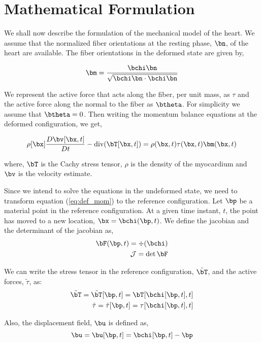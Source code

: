 \section{Mathematical Formulation}

We shall now describe the formulation of the mechanical model of the heart. We assume that the normalized fiber orientations at the resting phase, $\bn$, of the heart are available. The fiber orientations in the deformed state are given by,

\begin{equation}
\bm = \frac{\bchi\bn}{\sqrt{\bchi\bn\cdot\bchi\bn}}
\end{equation}

We represent the active force that acts along the fiber, per unit mass, as $\tau$ and the active force along the normal to the fiber as $\btheta$. For simplicity we assume that $\btheta = 0$. Then writing the momentum balance equations at the deformed configuration, we get,

\begin{equation}
\label{eq:def_mom}
\rho[\bx] \frac{D \bv [\bx, t]}{Dt} - \mbox{div} (\bT [\bx, t]) = \rho(\bx, t)\tau(\bx, t)\bm(\bx, t)
\end{equation}

where, $\bT$ is the Cachy stress tensor, $\rho$ is the density of the myocardium and $\bv$ is the velocity estimate.

Since we intend to solve the equations in the undeformed state, we need to transform equation (\ref{eq:def_mom}) to the reference configuration. Let $\bp$ be a material point in the reference configuration. At a given time instant, $t$, the point has moved to a new location, $\bx = \bchi(\bp, t)$. We define the jacobian and the determinant of the jacobian as,
\begin{eqnarray*}
\bF(\bp, t) = \div (\bchi) \\
\mathcal{J} = \det \bF
\end{eqnarray*}

We can write the stress tensor in the reference configuration, $\tilde{\bT}$, and the active forces, $\tilde{\tau}$, as:
\begin{eqnarray*}
\tilde{\bT} = \tilde{\bT}[\bp, t] =  \bT[\bchi[\bp, t], t] \\
\tilde{\tau} = \tilde{\tau}[\bp, t] =  \tau[\bchi[\bp, t], t]
\end{eqnarray*}

Also, the displacement field, $\bu$ is defined as,
\[
\bu = \bu[\bp, t] = \bchi[\bp, t] - \bp
\]

